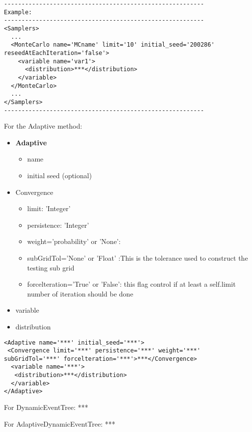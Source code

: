 \begin{lstlisting}[style=XML]
---------------------------------------------------------
Example:
---------------------------------------------------------
<Samplers>
  ...
  <MonteCarlo name='MCname' limit='10' initial_seed='200286' reseedAtEachIteration='false'> 
    <variable name='var1'> 
      <distribution>***</distribution> 	
    </variable> 
  </MonteCarlo>
  ...
</Samplers>
---------------------------------------------------------
\end{lstlisting}




For the Adaptive method:
\begin{itemize}
\item \textbf{Adaptive}
\begin{itemize}
\item name
\item initial seed (optional)
\end{itemize}
\item Convergence
\begin{itemize}
\item limit: 'Integer'
\item persistence: 'Integer'
\item weight='probability' or 'None': 
\item subGridTol='None' or 'Float' :This is the tolerance used to construct the testing sub grid
\item forcelteration='True' or 'False': this flag control if at least a self.limit number of iteration should be done
\end{itemize}
\item variable
\item distribution
\end{itemize}

\begin{lstlisting}[style=XML]
<Adaptive name='***' initial_seed='***'> 
 <Convergence limit='***' persistence='***' weight='***' subGridTol='***' forcelteration='***'>***</Convergence>  
  <variable name='***'>
   <distribution>***</distribution>
  </variable> 
</Adaptive>   
\end{lstlisting}



For DynamicEventTree:
***

For AdaptiveDynamicEventTree:
***


























